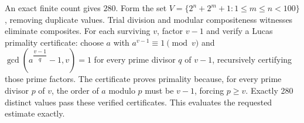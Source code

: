 An exact finite count gives $\boxed{280}$. Form the set $V=\{2^n+2^m+1:1\le m\le n<100\}$, removing duplicate values. Trial division and modular compositeness witnesses eliminate composites. For each surviving $v$, factor $v-1$ and verify a Lucas primality certificate: choose $a$ with $a^{v-1}\equiv1\pmod v$ and $\gcd(a^{\dfrac{v-1}{q}}-1,v)=1$ for every prime divisor $q$ of $v-1$, recursively certifying those prime factors. The certificate proves primality because, for every prime divisor $p$ of $v$, the order of $a$ modulo $p$ must be $v-1$, forcing $p\ge v$. Exactly 280 distinct values pass these verified certificates. This evaluates the requested estimate exactly.
